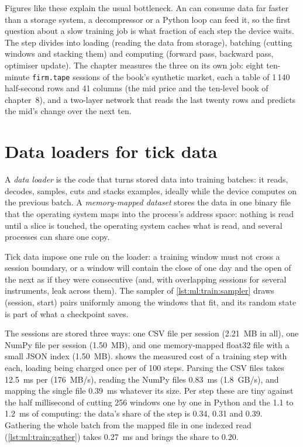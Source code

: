 Figures like these explain the usual bottleneck. An  can consume data far faster than a storage system, a
decompressor or a Python loop can feed it, so the first question about a slow training job is what fraction of each step the
device waits. The step divides into loading (reading the data from storage), batching (cutting windows and stacking them) and
computing (forward pass, backward pass, optimiser update). The chapter measures the three on its own job: eight ten-minute
\texttt{firm.tape} sessions of the book's synthetic market, each a table of 1\,140 half-second rows and 41 columns (the mid
price and the ten-level book of chapter~8), and a two-layer network that reads the last twenty rows and predicts the mid's
change over the next ten.

\section{Data loaders for tick data}

\begin{definition}\label{def:ml:training-infrastructure:loader}
A \emph{data loader} is the code that turns stored data into training batches: it reads, decodes, samples,
cuts and stacks examples, ideally while the device computes on the previous batch. A \emph{memory-mapped
dataset} stores the data in one binary file that the operating system maps into the process's
address space: nothing is read until a slice is touched, the operating system caches what is read, and several processes can
share one copy.
\end{definition}

Tick data impose one rule on the loader: a training window must not cross a session boundary, or a window will contain the
close of one day and the open of the next as if they were consecutive (and, with overlapping sessions for several instruments,
leak across them). The sampler of \cref{lst:ml:train:sampler} draws (session, start) pairs uniformly among the windows that fit,
and its random state is part of what a checkpoint saves.

The sessions are stored three ways: one CSV file per session (2.21~MB in all), one NumPy file per session (1.50~MB), and one
memory-mapped float32 file with a small JSON index (1.50~MB).  shows the measured cost of a training step
with each, loading being charged once per  of 100 steps. Parsing the CSV files takes 12.5~ms per  (176~MB/s),
reading the NumPy files 0.83~ms (1.8~GB/s), and mapping the single file 0.39~ms whatever its size. Per step these are tiny
against the half millisecond of cutting 256 windows one by one in Python and the 1.1 to 1.2~ms of computing: the data's share of
the step is 0.34, 0.31 and 0.39. Gathering the whole batch from the mapped file in one indexed read
(\cref{lst:ml:train:gather}) takes 0.27~ms and brings the share to 0.20.

